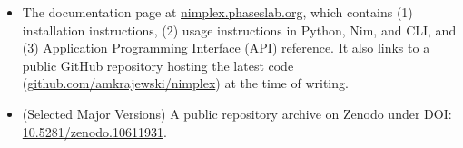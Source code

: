 \begin{itemize}
    \item The documentation page at \href{https://nimplex.phaseslab.org}{nimplex.phaseslab.org}, which contains (1) installation instructions, (2) usage instructions in Python, Nim, and CLI, and (3) Application Programming Interface (API) reference. It also links to a public GitHub repository hosting the latest code (\href{https://github.com/amkrajewski/nimplex}{github.com/amkrajewski/nimplex}) at the time of writing.


    \item (Selected Major Versions) A public repository archive on Zenodo under DOI: \href{https://doi.org/10.5281/zenodo.10611931}{10.5281/zenodo.10611931}.
\end{itemize}


\printbibliography[heading=subbibintoc]
